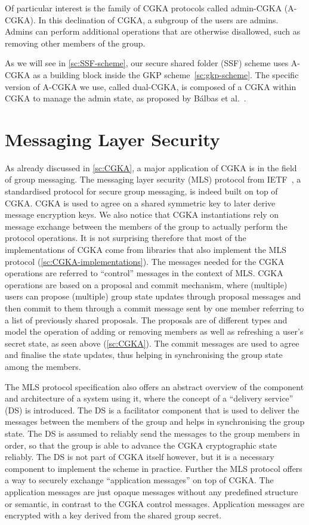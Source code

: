 Of particular interest is the family of CGKA protocols called admin-CGKA (A-CGKA).
In this declination of CGKA, a subgroup of the users are admins. 
Admins can perform additional operations that are otherwise disallowed, such as removing other members of the group.

As we will see in \cref{sc:SSF-scheme}, our secure shared folder (SSF) scheme uses A-CGKA as a building block
inside the GKP scheme~\cref{sc:gkp-scheme}.
The specific version of A-CGKA we use, called dual-CGKA, is composed of a CGKA within CGKA to manage the admin state, as proposed by
B{\'a}lbas et al.\!~\cite{USENIX:BalColVau23}.

\section{Messaging Layer Security}\label{sc:MLS}

As already discussed in \cref{sc:CGKA}, a major application of CGKA is in the field of group messaging.
The messaging layer security (MLS) protocol from IETF~\cite{rfc9420},
a standardised protocol for secure group messaging, is indeed 
built on top of CGKA. CGKA is used to agree on a shared symmetric key
to later derive message encryption keys.
We also notice that CGKA instantiations rely on message exchange
between the members of the group to actually perform the protocol operations.
It is not surprising therefore that most of the implementations
of CGKA come from libraries that also implement the MLS protocol (\cref{sc:CGKA-implementations}).
The messages needed for the CGKA operations are referred to ``control'' messages in the context of MLS.
CGKA operations are based on a proposal and commit mechanism,
where (multiple) users can propose (multiple) group state updates
through proposal messages and then commit to them through a commit message
sent by one member referring to a list of previously shared proposals. 
The proposals are of different types and model the operation of adding or removing 
members as well as refreshing a user's secret state, as seen above (\cref{sc:CGKA}).
The commit messages are used to agree and finalise the state updates,
thus helping in synchronising the group state among the members.

The MLS protocol specification also offers an abstract overview of
the component and architecture of a system using it, 
where the concept of a ``delivery service''
(DS) is introduced. The DS is a facilitator component that is used to 
deliver the messages between the members of the group and helps in
synchronising the group state. The DS is assumed to reliably
send the messages to the group members in order, so that the
group is able to advance the CGKA cryptographic state reliably.
The DS is not part of CGKA itself however,
but it is a necessary component to implement the scheme in practice.
Further the MLS protocol offers a way to securely exchange ``application messages''
on top of CGKA. The application messages are just opaque messages
without any predefined structure or semantic, in contrast to the
CGKA control messages.
Application messages are encrypted with a key derived from the shared group secret.

